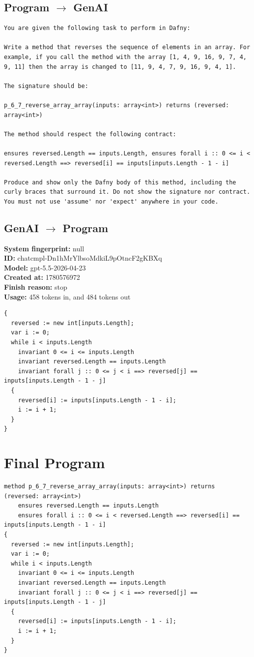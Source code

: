 \documentclass{article}
\begin{document}
\subsection*{Program $\rightarrow$ GenAI}
\begin{lstlisting}
You are given the following task to perform in Dafny:

Write a method that reverses the sequence of elements in an array. For example, if you call the method with the array [1, 4, 9, 16, 9, 7, 4, 9, 11] then the array is changed to [11, 9, 4, 7, 9, 16, 9, 4, 1].

The signature should be:

p_6_7_reverse_array_array(inputs: array<int>) returns (reversed: array<int>)

The method should respect the following contract:

ensures reversed.Length == inputs.Length, ensures forall i :: 0 <= i < reversed.Length ==> reversed[i] == inputs[inputs.Length - 1 - i]

Produce and show only the Dafny body of this method, including the curly braces that surround it. Do not show the signature nor contract. You must not use 'assume' nor 'expect' anywhere in your code.
\end{lstlisting}
\subsection*{GenAI $\rightarrow$ Program}
\textbf{System fingerprint: }null
\\\textbf{ID: }chatcmpl-Dn1hMrYlbsoMdkiL9pOtncF2gKBXq
\\\textbf{Model: }gpt-5.5-2026-04-23
\\\textbf{Created at: }1780576972
\\\textbf{Finish reason: }stop
\\\textbf{Usage: }458 tokens in, and 484 tokens out
\begin{lstlisting}
{
  reversed := new int[inputs.Length];
  var i := 0;
  while i < inputs.Length
    invariant 0 <= i <= inputs.Length
    invariant reversed.Length == inputs.Length
    invariant forall j :: 0 <= j < i ==> reversed[j] == inputs[inputs.Length - 1 - j]
  {
    reversed[i] := inputs[inputs.Length - 1 - i];
    i := i + 1;
  }
}
\end{lstlisting}
\section*{Final Program}
\begin{lstlisting}
method p_6_7_reverse_array_array(inputs: array<int>) returns (reversed: array<int>)
	ensures reversed.Length == inputs.Length
	ensures forall i :: 0 <= i < reversed.Length ==> reversed[i] == inputs[inputs.Length - 1 - i]
{
  reversed := new int[inputs.Length];
  var i := 0;
  while i < inputs.Length
    invariant 0 <= i <= inputs.Length
    invariant reversed.Length == inputs.Length
    invariant forall j :: 0 <= j < i ==> reversed[j] == inputs[inputs.Length - 1 - j]
  {
    reversed[i] := inputs[inputs.Length - 1 - i];
    i := i + 1;
  }
}
\end{lstlisting}
\end{document}
